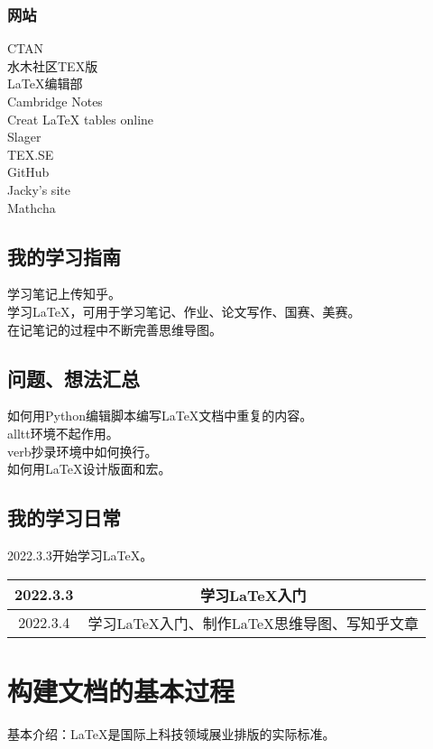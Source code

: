 \documentclass{book}%
\begin{document}
    \subsection{网站}
    CTAN\\
    水木社区TEX版\\
    LaTeX编辑部\\
    Cambridge Notes\\
    Creat LaTeX tables online\\
    Slager\\
    TEX.SE\\
    GitHub\\
    Jacky's site\\
    Mathcha\\
    
	\section{我的学习指南}
	学习笔记上传知乎。\\
	学习\LaTeX ，可用于学习笔记、作业、论文写作、国赛、美赛。\\
	在记笔记的过程中不断完善思维导图。\\
	
	\section{问题、想法汇总}
	如何用Python编辑脚本编写LaTeX文档中重复的内容。\\
	alltt环境不起作用。\\
	verb抄录环境中如何换行。\\
	如何用LaTeX设计版面和宏。\\
	
	\section{我的学习日常}
	2022.3.3开始学习\LaTeX。\\
	\begin{table}[h]
		\begin{tabular}{|c|c|}
			\hline
			2022.3.3&学习LaTeX入门\\
			\hline
			2022.3.4&学习LaTeX入门、制作LaTeX思维导图、写知乎文章\\
			\hline
		\end{tabular}
	\end{table}

	\chapter{构建文档的基本过程}
	基本介绍：LaTeX是国际上科技领域展业排版的实际标准。\\
	
\end{document}
